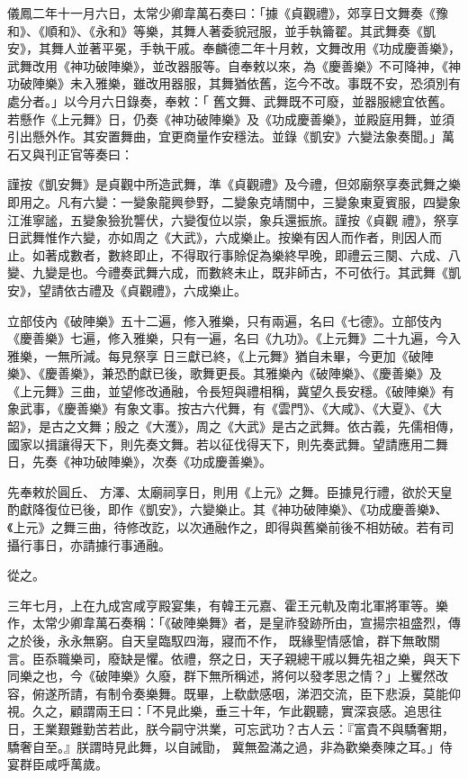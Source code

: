 \begin{pinyinscope}
 儀鳳二年十一月六日，太常少卿韋萬石奏曰：「據《貞觀禮》，郊享日文舞奏《豫和》、《順和》、《永和》等樂，其舞人著委貌冠服，並手執籥翟。其武舞奏《凱安》，其舞人並著平冕，手執干戚。奉麟德二年十月敕，文舞改用《功成慶善樂》，武舞改用《神功破陣樂》，並改器服等。自奉敕以來，為《慶善樂》不可降神，《神功破陣樂》未入雅樂，雖改用器服，其舞猶依舊，迄今不改。事既不安，恐須別有處分者。」以今月六日錄奏，奉敕：「
 舊文舞、武舞既不可廢，並器服總宜依舊。若懸作《上元舞》日，仍奏《神功破陣樂》及《功成慶善樂》，並殿庭用舞，並須引出懸外作。其安置舞曲，宜更商量作安穩法。並錄《凱安》六變法象奏聞。」萬石又與刊正官等奏曰：



 謹按《凱安舞》是貞觀中所造武舞，準《貞觀禮》及今禮，但郊廟祭享奏武舞之樂即用之。凡有六變：一變象龍興參野，二變象克靖關中，三變象東夏賓服，四變象江淮寧謐，五變象獫狁讋伏，六變復位以崇，象兵還振旅。謹按《貞觀
 禮》，祭享日武舞惟作六變，亦如周之《大武》，六成樂止。按樂有因人而作者，則因人而止。如著成數者，數終即止，不得取行事賒促為樂終早晚，即禮云三闋、六成、八變、九變是也。今禮奏武舞六成，而數終未止，既非師古，不可依行。其武舞《凱安》，望請依古禮及《貞觀禮》，六成樂止。



 立部伎內《破陣樂》五十二遍，修入雅樂，只有兩遍，名曰《七德》。立部伎內《慶善樂》七遍，修入雅樂，只有一遍，名曰《九功》。《上元舞》二十九遍，今入雅樂，一無所減。每見祭享
 日三獻已終，《上元舞》猶自未畢，今更加《破陣樂》、《慶善樂》，兼恐酌獻已後，歌舞更長。其雅樂內《破陣樂》、《慶善樂》及《上元舞》三曲，並望修改通融，令長短與禮相稱，冀望久長安穩。《破陣樂》有象武事，《慶善樂》有象文事。按古六代舞，有《雲門》、《大咸》、《大夏》、《大韶》，是古之文舞；殷之《大濩》，周之《大武》是古之武舞。依古義，先儒相傳，國家以揖讓得天下，則先奏文舞。若以征伐得天下，則先奏武舞。望請應用二舞日，先奏《神功破陣樂》，次奏《功成慶善樂》。



 先奉敕於圓丘、
 方澤、太廟祠享日，則用《上元》之舞。臣據見行禮，欲於天皇酌獻降復位已後，即作《凱安》，六變樂止。其《神功破陣樂》、《功成慶善樂》、《上元》之舞三曲，待修改訖，以次通融作之，即得與舊樂前後不相妨破。若有司攝行事日，亦請據行事通融。



 從之。



 三年七月，上在九成宮咸亨殿宴集，有韓王元嘉、霍王元軌及南北軍將軍等。樂作，太常少卿韋萬石奏稱：「《破陣樂舞》者，是皇祚發跡所由，宣揚宗祖盛烈，傳之於後，永永無窮。自天皇臨馭四海，寢而不作，
 既緣聖情感愴，群下無敢關言。臣忝職樂司，廢缺是懼。依禮，祭之日，天子親總干戚以舞先祖之樂，與天下同樂之也，今《破陣樂》久廢，群下無所稱述，將何以發孝思之情？」上矍然改容，俯遂所請，有制令奏樂舞。既畢，上欷歔感咽，涕泗交流，臣下悲淚，莫能仰視。久之，顧謂兩王曰：「不見此樂，垂三十年，乍此觀聽，實深哀感。追思往日，王業艱難勤苦若此，朕今嗣守洪業，可忘武功？古人云：『富貴不與驕奢期，驕奢自至。』朕謂時見此舞，以自誡勖，
 冀無盈滿之過，非為歡樂奏陳之耳。」侍宴群臣咸呼萬歲。




\end{pinyinscope}
